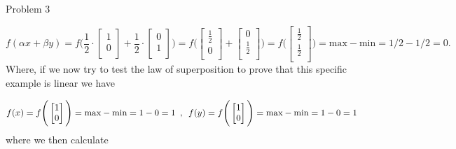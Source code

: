\begin{problem}{Problem 3}
\begin{highlight}
        \begin{equation}
            f(\alpha x + \beta y) = f \Bigg( \frac{1}{2} \cdot
                \begin{bmatrix}
                    1 \\
                    0 \\
                \end{bmatrix}
                + \frac{1}{2} \cdot
                \begin{bmatrix}
                    0 \\
                    1 \\
                \end{bmatrix} 
                \Bigg) = 
                f \Bigg ( 
                \begin{bmatrix}
                    \frac{1}{2} \\
                    0 \\
                \end{bmatrix}
                + 
                \begin{bmatrix}
                    0 \\
                    \frac{1}{2} \\
                \end{bmatrix}
                \Bigg) = f \Bigg(
                \begin{bmatrix}
                    \frac{1}{2} \\
                    \frac{1}{2} \\
                \end{bmatrix}
                \Bigg) = \text{max} - \text{min} = 1/2 - 1/2 = 0.
        \end{equation}
        Where, if we now try to test the law of superposition to prove that this specific example is linear we have

        \begin{equation}
            f(x) = f \Bigg(
                \begin{bmatrix}
                    1 \\
                    0 \\
                \end{bmatrix}
                \Bigg) = \text{max} - \text{min} = 1 - 0 = 1 \hspace*{5pt} , \hspace*{5pt}
            f(y) = f \Bigg(
                \begin{bmatrix}
                    1 \\
                    0 \\
                \end{bmatrix}
                \Bigg) = \text{max} - \text{min} = 1 - 0 = 1
        \end{equation}
        where we then calculate 


\end{highlight}
\end{problem}
